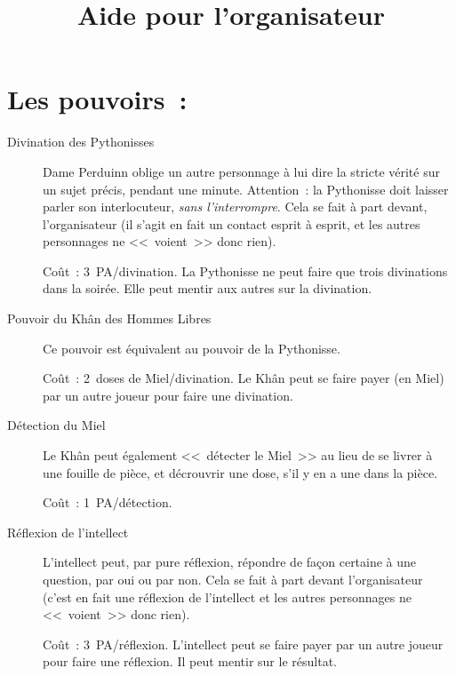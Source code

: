 \documentclass{article}
\title{Aide pour l'organisateur}
\date{}
\begin{document}
\maketitle

\section*{Les pouvoirs~:}

\begin{description}
    \item[Divination des Pythonisses] Dame Perduinn oblige un autre personnage
        à lui dire la stricte vérité sur un sujet précis, pendant une minute.
        Attention~: la Pythonisse doit laisser parler son interlocuteur,
        \emph{sans l'interrompre}.  Cela se fait à part devant, l'organisateur
        (il s'agit en fait un contact esprit à esprit, et les autres
        personnages ne <<~voient~>> donc rien).
        
        Coût~: 3~PA/divination. La Pythonisse ne peut faire que trois
        divinations dans la soirée. Elle peut mentir aux autres sur la
        divination.

    \item[Pouvoir du Khân des Hommes Libres] Ce pouvoir est équivalent au
        pouvoir de la Pythonisse.

        Coût~: 2~doses de Miel/divination. Le Khân peut se faire payer (en
        Miel) par un autre joueur pour faire une divination.

    \item[Détection du Miel] Le Khân peut également <<~détecter le Miel~>> au
        lieu de se livrer à une fouille de pièce, et décrouvrir une dose, s'il
        y en a une dans la pièce.

        Coût~: 1~PA/détection.

    \item[Réflexion de l'intellect] L'intellect peut, par pure réflexion,
        répondre de façon certaine à une question, par oui ou par non. Cela se
        fait à part devant l'organisateur (c'est en fait une réflexion de
        l'intellect et les autres personnages ne <<~voient~>> donc rien).
        
        Coût~: 3~PA/réflexion. L'intellect peut se faire payer par un autre
        joueur pour faire une réflexion. Il peut mentir sur le résultat.

\end{description}
\end{document}
